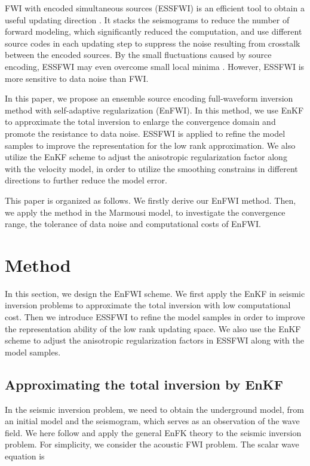 \documentclass{gji}
\begin{document}
FWI with encoded simultaneous sources (ESSFWI) is an efficient tool to obtain a useful updating direction \cite{kr,be,ca}. It stacks the seismograms to reduce the number of forward modeling, which significantly reduced the computation, and use different source codes in each updating step to suppress the noise resulting from crosstalk between the encoded sources. By the small fluctuations caused by source encoding, ESSFWI may even overcome small local minima \cite{ca}. However, ESSFWI is more sensitive to data noise \cite{kr} than FWI.

In this paper, we propose an ensemble source encoding full-waveform inversion method with self-adaptive regularization (EnFWI). In this method, we use EnKF to approximate the total inversion to enlarge the convergence domain and promote the resistance to data noise. ESSFWI is applied to refine the model samples to improve the representation for the low rank approximation. We also utilize the EnKF scheme to adjust the anisotropic regularization factor along with the velocity model, in order to utilize the smoothing constrains in different directions to further reduce the model error.

This paper is organized as follows. We firstly derive our EnFWI method. Then, we apply the method in the Marmousi model, to investigate the convergence range, the tolerance of data noise and computational costs of EnFWI.


\section{Method}

In this section, we design the EnFWI scheme. We first apply the EnKF in seismic inversion problems to approximate the total inversion with low computational cost. Then we introduce ESSFWI to refine the model samples in order to improve the representation ability of the low rank updating space. We also use the EnKF scheme to adjust the anisotropic regularization factors in ESSFWI along with the model samples.

\subsection{Approximating the total inversion by EnKF}

In the seismic inversion problem, we need to obtain the underground model, from an initial model and the seismogram, which serves as an observation of the wave field. We here follow \cite{ev03} and apply the general EnFK theory to the seismic inversion problem.
For simplicity, we consider the acoustic FWI problem. The scalar wave equation is
\end{document}
